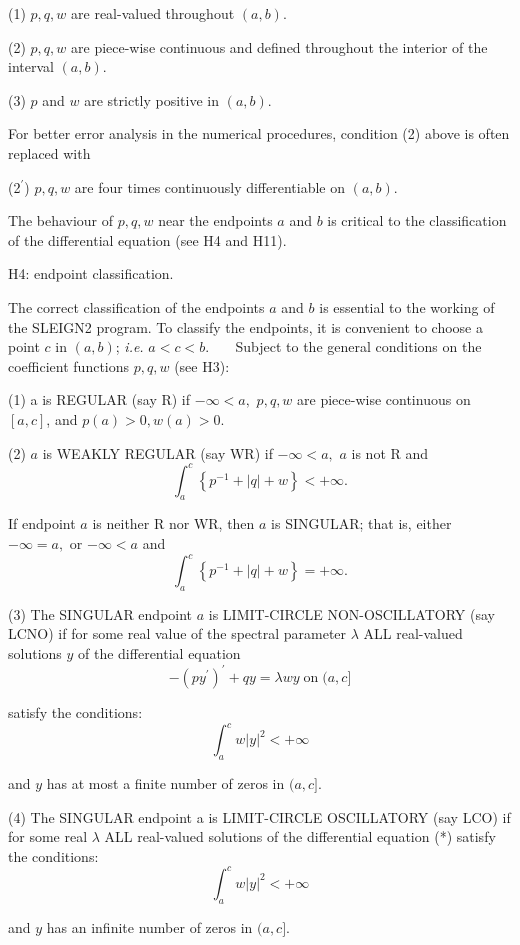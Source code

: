 \documentclass[12pt]{amsart}%
\theoremstyle{plain}
\numberwithin{equation}{section}
\numberwithin{theorem}{section}
\begin{document}
(1) $p,q,w$ are real-valued throughout $(a,b)$.

(2) $p,q,w$ are piece-wise continuous and defined throughout the interior of
the interval $(a,b)$.

(3) $p$ and $w$ are strictly positive in $(a,b)$.

\noindent For better error analysis in the numerical procedures, condition (2)
above is often replaced with

(2$^{\prime}$) $p,q,w$ are four times continuously differentiable on $(a,b)$.

\noindent The behaviour of $p,q,w$ near the endpoints $a$ and $b$ is critical
to the classification of the differential equation (see H4 and H11).

\medskip

H4: endpoint classification.

The correct classification of the endpoints $a$ and $b$ is essential to the
working of the SLEIGN2 program. To classify the endpoints, it is convenient to
choose a point $c$ in $(a,b)$; \textit{i.e.} $a<c<b$. \quad\quad$\quad
\;\;$Subject to the general conditions on the coefficient functions $p,q,w$
(see H3):

(1) a is REGULAR (say R) if $-\infty<a,$ $p,q,w$ are piece-wise continuous on
$[a,c]$, and $p(a)>0,w(a)>0.$

(2) $a$ is WEAKLY REGULAR (say WR) if $-\infty<a,$ $a$ is not R and%
\[
\int_{a}^{c}\left\{  p^{-1}+\left|  q\right|  +w\right\}  <+\infty.
\]

If endpoint $a$ is neither R nor WR, then $a$ is SINGULAR; that is, either
$-\infty=a,$ or $-\infty<a$ and%
\[
\int_{a}^{c}\left\{  p^{-1}+\left|  q\right|  +w\right\}  =+\infty.
\]

(3) The SINGULAR endpoint $a$ is LIMIT-CIRCLE NON-OSCILLATORY (say LCNO) if
for some real value of the spectral parameter $\lambda$ ALL real-valued
solutions $y$ of the differential equation%
\[
-(py^{\prime})^{\prime}+qy=\lambda wy\;\text{on}\;(a,c]
\]

satisfy the conditions:%
\[
\int_{a}^{c}w\left|  y\right|  ^{2}<+\infty
\]

\noindent and $y$ has at most a finite number of zeros in $(a,c].$

(4) The SINGULAR endpoint a is LIMIT-CIRCLE OSCILLATORY (say LCO) if for some
real $\lambda$ ALL real-valued solutions of the differential equation (*)
satisfy the conditions:%
\[
\int_{a}^{c}w\left|  y\right|  ^{2}<+\infty
\]

\noindent and $y$ has an infinite number of zeros in $(a,c].$
\end{document}
